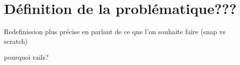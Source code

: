 \section{Définition de la problématique???}
Redefinission plus précise en parlant de ce que l'on souhaite faire (snap vs scratch)

pourquoi rails?
